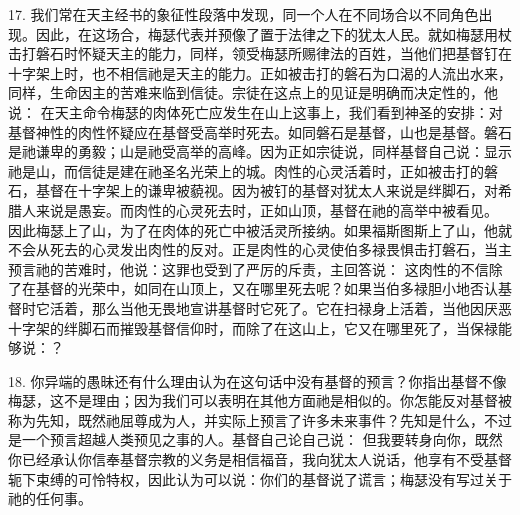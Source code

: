 17. 我们常在天主经书的象征性段落中发现，同一个人在不同场合以不同角色出现。因此，在这场合，梅瑟代表并预像了置于法律之下的犹太人民。就如梅瑟用杖击打磐石时怀疑天主的能力，同样，领受梅瑟所赐律法的百姓，当他们把基督钉在十字架上时，也不相信祂是天主的能力。正如被击打的磐石为口渴的人流出水来，同样，生命因主的苦难来临到信徒。宗徒在这点上的见证是明确而决定性的，他说： 在天主命令梅瑟的肉体死亡应发生在山上这事上，我们看到神圣的安排：对基督神性的肉性怀疑应在基督受高举时死去。如同磐石是基督，山也是基督。磐石是祂谦卑的勇毅；山是祂受高举的高峰。因为正如宗徒说，同样基督自己说：显示祂是山，而信徒是建在祂圣名光荣上的城。肉性的心灵活着时，正如被击打的磐石，基督在十字架上的谦卑被藐视。因为被钉的基督对犹太人来说是绊脚石，对希腊人来说是愚妄。而肉性的心灵死去时，正如山顶，基督在祂的高举中被看见。 因此梅瑟上了山，为了在肉体的死亡中被活灵所接纳。如果福斯图斯上了山，他就不会从死去的心灵发出肉性的反对。正是肉性的心灵使伯多禄畏惧击打磐石，当主预言祂的苦难时，他说：这罪也受到了严厉的斥责，主回答说： 这肉性的不信除了在基督的光荣中，如同在山顶上，又在哪里死去呢？如果当伯多禄胆小地否认基督时它活着，那么当他无畏地宣讲基督时它死了。它在扫禄身上活着，当他因厌恶十字架的绊脚石而摧毁基督信仰时，而除了在这山上，它又在哪里死了，当保禄能够说：？\par

18. 你异端的愚昧还有什么理由认为在这句话中没有基督的预言？你指出基督不像梅瑟，这不是理由；因为我们可以表明在其他方面祂是相似的。你怎能反对基督被称为先知，既然祂屈尊成为人，并实际上预言了许多未来事件？先知是什么，不过是一个预言超越人类预见之事的人。基督自己论自己说： 但我要转身向你，既然你已经承认你信奉基督宗教的义务是相信福音，我向犹太人说话，他享有不受基督轭下束缚的可怜特权，因此认为可以说：你们的基督说了谎言；梅瑟没有写过关于祂的任何事。\par


